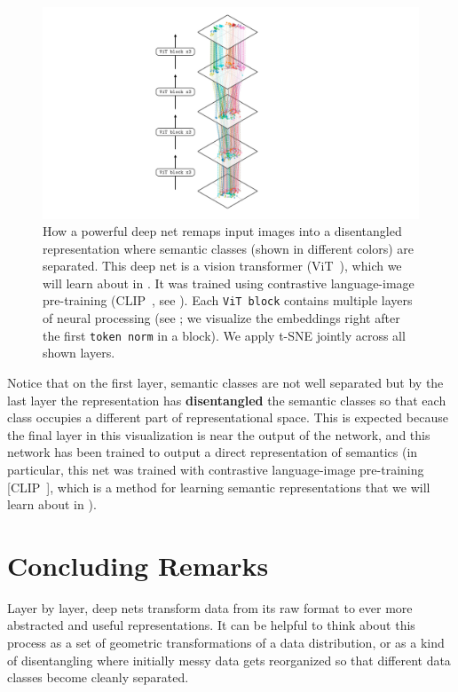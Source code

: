 \begin{figure}[t]
    \centerline{
    \includegraphics[width=0.375\linewidth]{./figures/neural_nets/vit_mapping_plot.pdf}
    }
    \caption{How a powerful deep net remaps input images into a disentangled representation where semantic classes (shown in different colors) are separated. This deep net is a vision transformer (ViT~\cite{dosovitskiy2020vit}), which we will learn about in \sect{\ref{sec:transformers:ViT_arch}}. It was trained using contrastive language-image pre-training (CLIP~\cite{radford2021learning}, see \sect{\ref{sec:VLMs:CLIP}}). Each \texttt{ViT block} contains multiple layers of neural processing (see \fig{\ref{fig:transformers:ViT_arch}}; we visualize the embeddings right after the first \texttt{token norm} in a block). We apply t-SNE jointly across all shown layers.} %
    \label{fig:neural_nets:vit_mapping_plot}
\end{figure}

Notice that on the first layer, semantic classes are not well separated but by the last layer the representation has {\bf disentangled} the semantic classes so that each class occupies a different part of representational space. This is expected because the final layer in this visualization is near the output of the network, and this network has been trained to output a direct representation of semantics (in particular, this net was trained with contrastive language-image pre-training [CLIP~\cite{radford2021learning}], which is a method for learning semantic representations that we will learn about in \sect{\ref{sec:VLMs:CLIP}}).%

\section{Concluding Remarks}
Layer by layer, deep nets transform data from its raw format to ever more abstracted and useful representations. It can be helpful to think about this process as a set of geometric transformations of a data distribution, or as a kind of disentangling where initially messy data gets reorganized so that different data classes become cleanly separated.